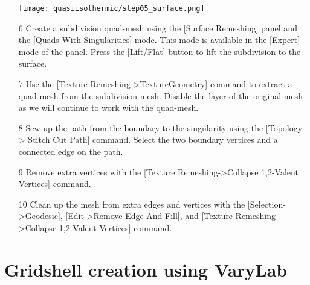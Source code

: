 \documentclass[Thesis.tex]{subfiles}
\begin{document}
\begin{itemize}
{\texttt{[image: quasiisothermic/step05\_surface.png]}
}
\item[6] Create a subdivision quad-mesh using the [Surface Remeshing] panel and the [Quads With Singularities] mode. This mode is available in the [Expert] mode of the panel. Press the [Lift/Flat] button to lift the subdivision to the surface.
\item[7] Use the [Texture Remeshing->TextureGeometry] command to extract a quad mesh from the subdivision mesh. Disable the layer of the original mesh as we will continue to work with the quad-mesh.
\item[8] Sew up the path from the boundary to the singularity using the [Topology-> Stitch Cut Path] command. Select the two boundary vertices and a connected edge on the path.
\item[9] Remove extra vertices with the [Texture Remeshing->Collapse 1,2-Valent Vertices] command.
\item[10] Clean up the mesh from extra edges and vertices with the [Selection->Geodesic], [Edit->Remove Edge And Fill], and [Texture Remeshing->Collapse 1,2-Valent Vertices] command.
\end{itemize}

\section{Gridshell creation using {\sc VaryLab}}

\subfilebibliography
\end{document}
